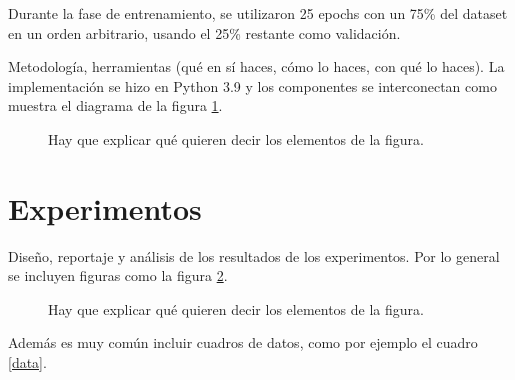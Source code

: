 \documentclass[a4]{sciposter}
\begin{document}
\begin{multicols}{2}
Durante la fase de entrenamiento, se utilizaron 25 epochs con un 75\% del dataset en un orden arbitrario, usando el 25\% restante como validación.


Metodología, herramientas (qué en sí haces, cómo lo haces, con qué lo
haces).  La implementación se hizo en Python 3.9 \citep{python} y los
componentes se interconectan como muestra el diagrama de la figura
\ref{diag}.

\begin{figure}
\captionsetup{type=figure} %
\setcounter{figure}{1} %
\begin{center}
\end{center}
\caption{Hay que explicar qué quieren decir los elementos de la figura.}
\label{diag}
\end{figure}

\section{Experimentos}

Diseño, reportaje y análisis de los resultados de los
experimentos. Por lo general se incluyen figuras como la figura
\ref{curvas}.

\begin{figure}
\setcounter{figure}{2} 
\captionsetup{type=figure} %
\begin{center}
   \end{center}
    \caption{Hay que explicar qué quieren decir los elementos de la figura.}
    \label{curvas}
\end{figure}

Además es muy común incluir cuadros de datos, como por ejemplo el cuadro \ref{data}.


\end{multicols}
\end{document}
